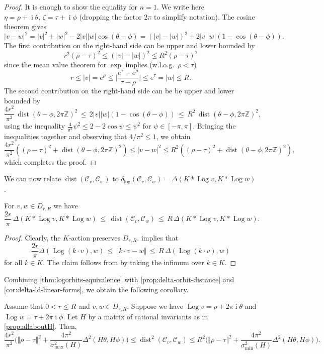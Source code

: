 \documentclass[a4paper,USenglish,cleveref,numberwithinsect]{lipics-v2021}
\DeclareMathOperator{\ii}{i}
\DeclareMathOperator{\Log}{Log}
\DeclareMathOperator{\dist}{dist}
\newcommand{\distLD}{\delta_{\log}}
\newcommand{\ZZ}{\mathbb{Z}}
\newcommand{\KK}{\ensuremath{\mathcal{C}}}
\numberwithin{equation}{section}
\begin{document}
\begin{proof}
It is enough to show the equality for $n=1$.
We write here $\eta = \rho+\ii\theta,\, \zeta=\tau+\ii\phi$ (dropping the factor $2\pi$ to simplify notation).
The cosine theorem gives
\[
  |v-w|^2 = |v|^2 + |w|^2 - 2|v||w|\cos(\theta-\phi) = (|v|-|w|)^2 + 2|v||w|\left(1-\cos(\theta-\phi)\right).
\]
The first contribution on the right-hand side can be upper and lower bounded by
\[
	r^2(\rho-\tau)^2\leq (|v|-|w|)^2\leq R^2 (\rho-\tau)^2
\]
since the mean value theorem for $\exp$ implies (w.l.o.g.\ $\rho < \tau$)
$$
 r \le |v| = e^\rho \le \Big|\frac{e^\tau - e^\rho}{\tau - \rho}\Big| \le e^\tau = |w| \le R .
$$
The second contribution on the right-hand side can be be upper and lower bounded by
\[
 \frac{4 r^2}{\pi^2}\,\dist(  \theta-\phi,2\pi\ZZ)^2\, \leq \,
  2|v||w|\left(1-\cos(\theta-\phi)\right)\,\leq \,R^2 \, \dist(  \theta-\phi,2\pi\ZZ)^2,
\]
using the inequality
$\frac{4}{\pi^2}\psi^2\leq 2-2\cos\psi \leq \psi^2$ for $\psi\in[-\pi,\pi]$.
Bringing the inequalities together and observing that $4/\pi^2\leq 1$, we obtain
\[
 \frac{4r^2}{\pi^2} \left( (\rho-\tau)^2 + \dist(  \theta-\phi,2\pi\ZZ)^2 \right)
   \leq |v-w|^2 \leq R^2 \left( (\rho-\tau)^2 + \dist(  \theta-\phi,2\pi\ZZ)^2 \right),
\]
which completes the proof.
\end{proof}

We can now relate %
$\dist(\KK_v,\KK_w)$ to $\distLD(\KK_v,\KK_w)=\Delta(K\ast \Log v, K\ast \Log w)$.

\begin{proposition}
\label{thm:logorbits-equivalence}
For $v,w\in D_{r,R}$ we have
\[
 \frac{2r}{\pi}\, \Delta(K\ast \Log v,K\ast \Log w) \, \leq \, \dist(\KK_v,\KK_w) \, \leq \,
  R\, \Delta(K\ast \Log v,K\ast \Log w).
\]
\end{proposition}

\begin{proof}
Clearly, the $K$-action preserves $D_{r,R}$.
 implies that
\[
 \frac{2r}{\pi} \Delta( \Log( k\cdot v ) , w ) \, \leq \,
  \Vert k\cdot v-w\Vert\, \leq \, R\, \Delta(\Log(k\cdot v), w)
\]
for all $k\in K$. The claim follows from by taking the infimum over $k\in K$.
\end{proof}

Combining \cref{thm:logorbits-equivalence} with
\cref{prop:delta-orbit-distance} and \cref{cor:delta-ld-linear-forms}, 
we obtain the following corollary.

\begin{corollary}\label{cor:K-orbits-approximation}
Assume that $0<r\leq R$ and $v,w\in D_{r,R}$. Suppose we have $\Log v=\rho+2\pi\ii\theta$ and
$\Log w = \tau+2\pi\ii\phi$.
Let $H$ by a matrix of rational invariants as in \cref{prop:allaboutH}. Then,
\[
 \frac{4r^2}{\pi^2} \big(\Vert\rho-\tau\Vert^2 +\frac{4\pi^2}{\sigma^2_{\max}(H) }
  \Delta^2(H\theta,H \phi)\big)  \leq \dist^2(\KK_v,\KK_w)
 \leq  R^2 \big(\Vert\rho-\tau\Vert^2 + \frac{4\pi^2}{\sigma^2_{\min}(H) }
   \Delta^2(H\theta, H\phi) \big) .
\]
\end{corollary}
\end{document}
